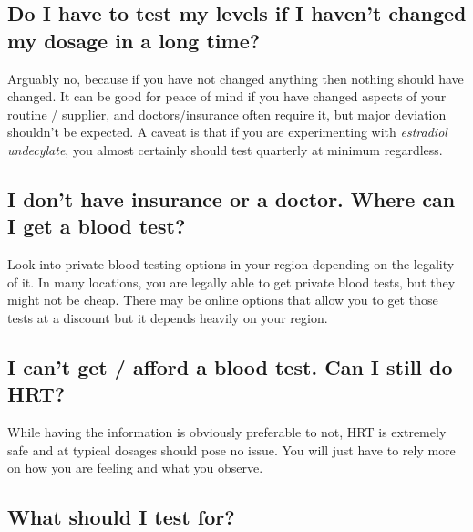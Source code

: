 \documentclass{article}
\begin{document}
\subsection{Do I have to test my levels if I haven’t changed my dosage in a long time?}

Arguably no, because if you have not changed anything then nothing should have changed. It can be good for peace of mind if you have changed aspects of your routine / supplier, and doctors/insurance often require it, but major deviation shouldn’t be expected. A caveat is that if you are experimenting with \textit{estradiol undecylate}, you almost certainly should test quarterly at minimum regardless.

\subsection{I don’t have insurance or a doctor. Where can I get a blood test?}

Look into private blood testing options in your region depending on the legality of it. In many locations, you are legally able to get private blood tests, but they might not be cheap. There may be online options that allow you to get those tests at a discount but it depends heavily on your region.

\subsection{I can’t get / afford a blood test. Can I still do HRT?}

While having the information is obviously preferable to not, HRT is extremely safe and at typical dosages should pose no issue. You will just have to rely more on how you are feeling and what you observe.

\subsection{What should I test for?}
\end{document}
